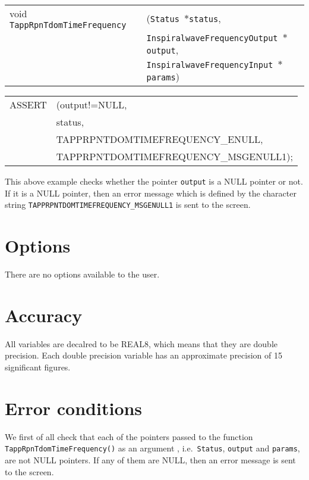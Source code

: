 \documentclass[12pt]{article}
\begin{document}
\begin{tabular}{ll}
void \texttt{TappRpnTdomTimeFrequency}&(\texttt{Status $\ast$status},     \\
                                   &\texttt{InspiralwaveFrequencyOutput $\ast$output}, \\
                                   &\texttt{InspiralwaveFrequencyInput $\ast$params})
\end{tabular}

\vspace{5mm}

\begin{tabular}{ll}
ASSERT & (output!=NULL,  \\
       &  status,    \\
       &  TAPPRPNTDOMTIMEFREQUENCY\_ENULL, \\
       &  TAPPRPNTDOMTIMEFREQUENCY\_MSGENULL1);
\end{tabular}

\vspace{5mm}

This above example checks whether the pointer \texttt{output} is a NULL pointer or not. If it is a NULL pointer, then an error message which is defined by the character string \texttt{TAPPRPNTDOMTIMEFREQUENCY\_MSGENULL1} is sent to the screen.


\section{Options}

There are no options available to the user.

\section{Accuracy}

All variables are decalred to be REAL8, which means that they are double precision.
Each double precision variable has an approximate precision of 15 significant figures.


\section{Error conditions}

We first of all check that each of the pointers passed to the function \\ \texttt{TappRpnTdomTimeFrequency()} as an argument , i.e.\ \texttt{Status}, \texttt{output} and \texttt{params}, are not NULL pointers. If any of them are NULL, then an error message is sent to the screen.
\end{document}
